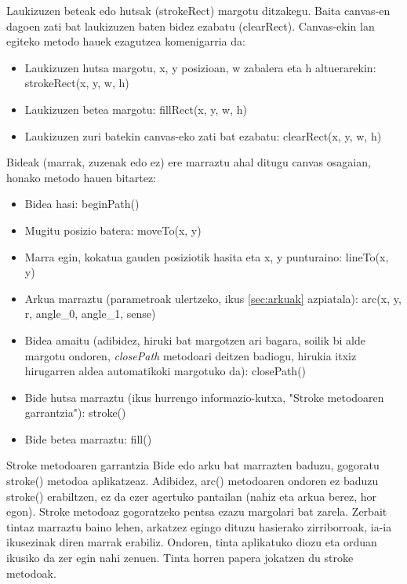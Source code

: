 Laukizuzen beteak edo hutsak (strokeRect)  margotu ditzakegu. Baita canvas-en dagoen zati bat laukizuzen baten bidez ezabatu (clearRect). Canvas-ekin lan egiteko metodo hauek ezagutzea komenigarria da:

\begin{itemize}
\item Laukizuzen hutsa margotu, x, y posizioan, w zabalera eta h altuerarekin: strokeRect(x, y, w, h) 
\item Laukizuzen betea margotu: fillRect(x, y, w, h) 
\item Laukizuzen zuri batekin canvas-eko zati bat ezabatu: clearRect(x, y, w, h) 
\end{itemize}

Bideak (marrak, zuzenak edo ez) ere marraztu ahal ditugu canvas osagaian, honako metodo hauen bitartez:

\begin{itemize}
\item Bidea hasi: beginPath() 
\item Mugitu posizio batera: moveTo(x, y) 
\item Marra egin, kokatua gauden posiziotik hasita eta x, y punturaino: lineTo(x, y) 
\item Arkua marraztu (parametroak ulertzeko, ikus \ref{sec:arkuak} azpiatala): arc(x, y, r, angle\_0, angle\_1, sense) 
\item Bidea amaitu (adibidez, hiruki bat margotzen ari bagara, soilik bi alde margotu ondoren, \textit{closePath} metodoari deitzen badiogu, hirukia itxiz hirugarren aldea automatikoki margotuko da): closePath() 
\item Bide hutsa marraztu (ikus hurrengo informazio-kutxa, "Stroke metodoaren garrantzia"): stroke() 
\item Bide betea marraztu: fill() 
\end{itemize}

\begin{alertinfo}{Stroke metodoaren garrantzia}
        Bide edo arku bat marrazten baduzu, gogoratu stroke() metodoa aplikatzeaz. Adibidez, arc() metodoaren ondoren ez baduzu stroke() erabiltzen, ez da ezer agertuko pantailan (nahiz eta arkua berez, hor egon). Stroke metodoaz gogoratzeko pentsa ezazu margolari bat zarela. Zerbait tintaz marraztu baino lehen, arkatzez egingo dituzu hasierako zirriborroak, ia-ia ikusezinak diren marrak erabiliz. Ondoren, tinta aplikatuko diozu eta orduan ikusiko da zer egin nahi zenuen. Tinta horren papera jokatzen du stroke metodoak.
    \end{alertinfo}

